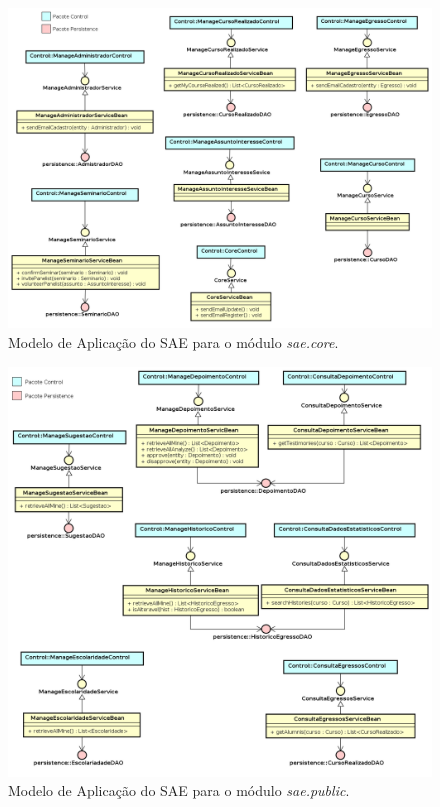 \newpage

\begin{figure}[!h]
  \centering
  \includegraphics[width=1\textwidth]{figuras/modeloaplicacaocore.png}
  \caption{Modelo de Aplicação do SAE para o módulo \textit{sae.core}.}
  \label{figura-modelo-aplicacao-core}
\end{figure}

\begin{figure}[!h]
  \centering
  \includegraphics[width=1\textwidth]{figuras/modeloaplicacaopublico.png}
  \caption{Modelo de Aplicação do SAE para o módulo \textit{sae.public}.}
  \label{figura-modelo-aplicacao-publico}
\end{figure}

